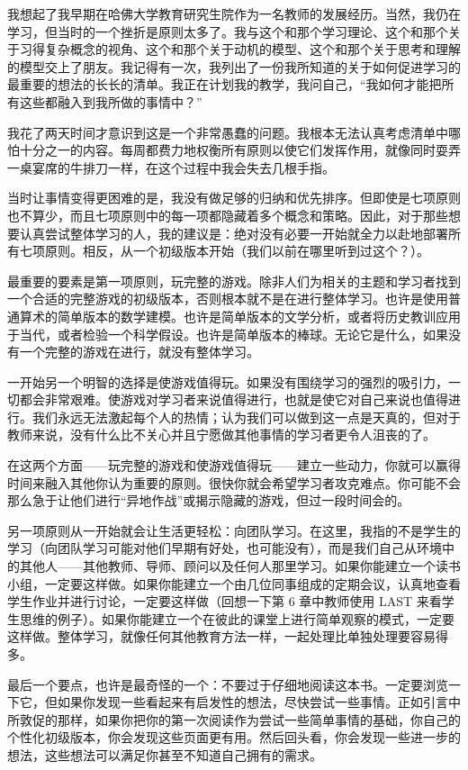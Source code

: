 我想起了我早期在哈佛大学教育研究生院作为一名教师的发展经历。当然，我仍在学习，但当时的一个挫折是原则太多了。我与这个和那个学习理论、这个和那个关于习得复杂概念的视角、这个和那个关于动机的模型、这个和那个关于思考和理解的模型交上了朋友。我记得有一次，我列出了一份我所知道的关于如何促进学习的最重要的想法的长长的清单。我正在计划我的教学，我问自己，“我如何才能把所有这些都融入到我所做的事情中？”

我花了两天时间才意识到这是一个非常愚蠢的问题。我根本无法认真考虑清单中哪怕十分之一的内容。每周都费力地权衡所有原则以使它们发挥作用，就像同时耍弄一桌宴席的牛排刀一样，在这个过程中我会失去几根手指。

当时让事情变得更困难的是，我没有做足够的归纳和优先排序。但即使是七项原则也不算少，而且七项原则中的每一项都隐藏着多个概念和策略。因此，对于那些想要认真尝试整体学习的人，我的建议是：绝对没有必要一开始就全力以赴地部署所有七项原则。相反，从一个初级版本开始（我们以前在哪里听到过这个？）。

最重要的要素是第一项原则，玩完整的游戏。除非人们为相关的主题和学习者找到一个合适的完整游戏的初级版本，否则根本就不是在进行整体学习。也许是使用普通算术的简单版本的数学建模。也许是简单版本的文学分析，或者将历史教训应用于当代，或者检验一个科学假设。也许是简单版本的棒球。无论它是什么，如果没有一个完整的游戏在进行，就没有整体学习。

一开始另一个明智的选择是使游戏值得玩。如果没有围绕学习的强烈的吸引力，一切都会非常艰难。使游戏对学习者来说值得进行，也就是使它对自己来说也值得进行。我们永远无法激起每个人的热情；认为我们可以做到这一点是天真的，但对于教师来说，没有什么比不关心并且宁愿做其他事情的学习者更令人沮丧的了。

在这两个方面——玩完整的游戏和使游戏值得玩——建立一些动力，你就可以赢得时间来融入其他你认为重要的原则。很快你就会希望学习者攻克难点。你可能不会那么急于让他们进行“异地作战”或揭示隐藏的游戏，但过一段时间会的。

另一项原则从一开始就会让生活更轻松：向团队学习。在这里，我指的不是学生的学习（向团队学习可能对他们早期有好处，也可能没有），而是我们自己从环境中的其他人——其他教师、导师、顾问以及任何人那里学习。如果你能建立一个读书小组，一定要这样做。如果你能建立一个由几位同事组成的定期会议，认真地查看学生作业并进行讨论，一定要这样做（回想一下第 6 章中教师使用 LAST 来看学生思维的例子）。如果你能建立一个在彼此的课堂上进行简单观察的模式，一定要这样做。整体学习，就像任何其他教育方法一样，一起处理比单独处理要容易得多。

最后一个要点，也许是最奇怪的一个：不要过于仔细地阅读这本书。一定要浏览一下它，但如果你发现一些看起来有启发性的想法，尽快尝试一些事情。正如引言中所敦促的那样，如果你把你的第一次阅读作为尝试一些简单事情的基础，你自己的个性化初级版本，你会发现这些页面更有用。然后回头看，你会发现一些进一步的想法，这些想法可以满足你甚至不知道自己拥有的需求。

